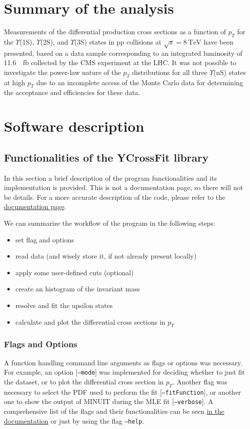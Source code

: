 \documentclass[a4paper,11pt]{article}
\begin{document}
\section{Summary of the analysis}
Measurements of the differential production cross sections as a function of $p_T$ for the $\Upsilon$(1S), $\Upsilon$(2S), and $\Upsilon$(3S) states in pp collisions at $\sqrt{s} = \SI{8}{\tera\eV}$ have been presented, based on a data sample corresponding to an integrated luminosity of \SI{11.6}{\per\femto\barn} collected by the CMS experiment at the LHC. It was not possible to investigate the power-law nature of the $p_T$ distributions for all three $\Upsilon$(nS) states at high $p_T$ due to an incomplete access of the Monte Carlo data for determining the acceptance and efficiencies for these data.

\newpage

\section{Software description}
\subsection{Functionalities of the YCrossFit library}
In this section a brief description of the program functionalities and its implementation is provided. This is not a documentation page, so there will not be details. For a more accurate description of the code, please refer to the \href{https://zenith378.github.io/Y-DiMuonResonances/html/index.html}{documentation page}.

We can summarize the workflow of the program in the following steps:
\begin{itemize}
    \item set flag and options
    \item read data (and wisely store it, if not already present locally)
    \item apply some user-defined cuts (optional)
    \item create an histogram of the invariant mass
    \item resolve and fit the upsilon states
    \item calculate and plot the differential cross sections in $p_T$
\end{itemize}

\subsubsection{Flags and Options}
A function handling command line arguments as flags or options was necessary. For example, an option [\texttt{--mode}] was implemented for deciding whether to just fit the dataset, or to plot the differential cross section in $p_T$. Another flag was necessary to select the PDF used to perform the fit [\texttt{--fitFunction}], or another one to show the output of MINUIT during the MLE fit [\texttt{--verbose}]. A comprehensive list of the flags and their functionalities can be seen  \href{https://zenith378.github.io/Y-DiMuonResonances/html/optionParse_8h.html#ae964ff8411b4fdcaf65cb5529aea4bef}{in the documentation} or just by using the flag \texttt{--help}.
\end{document}
